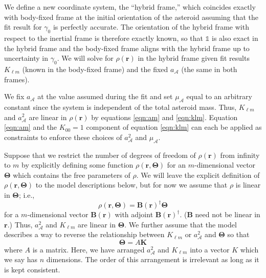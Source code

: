 We define a new coordinate system, the ``hybrid frame,'' which coincides exactly with body-fixed frame at the initial orientation of the asteroid assuming that the fit result for $\gamma_0$ is perfectly accurate. The orientation of the hybrid frame with respect to the inertial frame is therefore exactly known, so that $\mathds{1}$ is also exact in the hybrid frame and the body-fixed frame aligns with the hybrid frame up to uncertainty in $\gamma_0$. We will solve for $\rho(\bm r)$ in the hybrid frame given fit results $K_{\ell m}$ (known in the body-fixed frame) and the fixed $a_\mathcal{A}$ (the same in both frames).

We fix $a_\mathcal{A}$ at the value assumed during the fit and set $\mu_\mathcal{A}$ equal to an arbitrary constant since the system is independent of the total asteroid mass. Thus, $K_{\ell m}$ and $a_\mathcal{A}^2$ are linear in $\rho(\bm r)$ by equations \ref{eqn:am} and \ref{eqn:klm}. Equation \ref{eqn:am} and the $K_{00}=1$ component of equation \ref{eqn:klm} can each be applied as constraints to enforce these choices of $a_\mathcal{A}^2$ and $\mu_\mathcal{A}$.

Suppose that we restrict the number of degrees of freedom of $\rho(\bm r)$ from infinity to $m$ by explicitly defining some function $\rho(\bm r, \bm \Theta)$ for an $m$-dimensional vector $\bm \Theta$ which contains the free parameters of $\rho$. We will leave the explicit definition of $\rho(\bm r, \bm \Theta)$ to the model descriptions below, but for now we assume that $\rho$ is linear in $\bm \Theta$; i.e.,
\begin{equation}
  \rho(\bm r, \bm \Theta) = \bm B(\bm r)^\dagger \bm \Theta
  \label{eqn:density-distro}
\end{equation}
for a $m$-dimensional vector $\bm B(\bm r)$ with adjoint $\bm B(\bm r)^\dagger$. ($\bm B$ need not be linear in $\bm r$.) Thus, $a_\mathcal{A}^2$ and $K_{\ell m}$ are linear in $\bm \Theta$. We further assume that the model describes a way to reverse the relationship between $K_{\ell m}$ or $a_\mathcal{A}^2$ and $\bm \Theta$ so that
\begin{equation}
  \bm \Theta = A \bm K
  \label{eqn:density-model}
\end{equation}
where $A$ is a matrix. Here, we have arranged $a_\mathcal{A}^2$ and $K_{\ell m}$ into a vector $K$ which we say has $n$ dimensions. The order of this arrangement is irrelevant as long as it is kept consistent.

